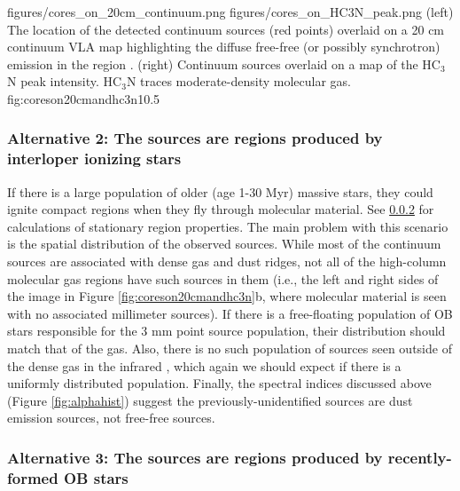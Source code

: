 \documentclass[twocolumn]{aastex61}
\begin{document}
\FigureTwo
{figures/cores_on_20cm_continuum.png}
{figures/cores_on_HC3N_peak.png}
{(left) The location of the detected continuum sources (red points) overlaid on a 20
cm continuum VLA map highlighting the diffuse free-free (or possibly
synchrotron) emission in the region \citep{Yusef-Zadeh2004a}.
(right) Continuum sources overlaid on a map
of the HC$_3$N peak intensity.  HC$_3$N traces moderate-density molecular gas.}
{fig:coreson20cmandhc3n}{1}{0.5\textwidth}

\subsubsection{Alternative 2: The sources are \hii regions produced by
interloper ionizing stars}
If there is a large population of older (age 1-30 Myr) massive stars, they could
ignite compact \hii regions when they fly through molecular material.  See
\ref{sec:theyarehiiregions} for calculations of stationary \hii region
properties.  The main problem with this scenario is the spatial distribution of
the observed sources.  While most of the continuum sources are associated with
dense gas and dust ridges, not all of the high-column molecular gas regions
have such sources in them (i.e., the left and right sides of the image in
Figure \ref{fig:coreson20cmandhc3n}b, where molecular material is seen with no
associated millimeter sources).  If there is a free-floating population of OB
stars responsible for the 3 mm point source population, their distribution
should match that of the gas.  Also, there is no such population of sources
seen outside of the dense gas in the infrared \citep[TODO: Who has done
infrared studies of Sgr B2?  You can infer what I have stated `by inspection'
of 2MASS, but it would be more straightforward to quote someone else][]{},
which again we should expect if there is a uniformly distributed population.  
Finally, the spectral indices discussed above (Figure \ref{fig:alphahist})
suggest the previously-unidentified sources are dust emission sources,
not free-free sources.



\subsubsection{Alternative 3: The sources are \hii regions produced by
recently-formed OB stars}
\label{sec:theyarehiiregions}
\end{document}
